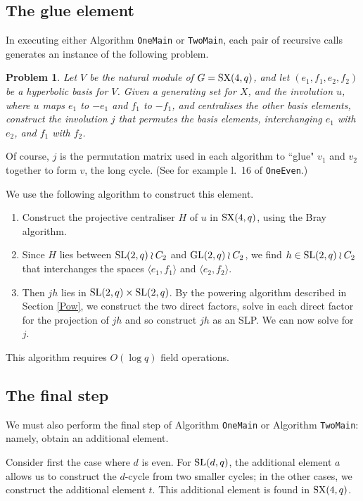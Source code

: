 \documentclass[12pt]{article}
\newtheorem{problem}[definition]{Problem}
\def\SL{{\rm SL}}
\def\GL{{\rm GL}}
\def\SX{{\rm SX}}
\begin{document}
\subsection{The glue element}
In executing either Algorithm {\tt OneMain} or {\tt TwoMain}, 
each pair of recursive calls generates
an instance of the following problem.

\begin{problem}
Let $V$ be the natural module of  $G=\SX(4,q)$, and let
$(e_1,f_1,e_2,f_2)$ be a hyperbolic basis for $V$. Given a generating
set for $X$, and the involution $u$, where $u$ maps $e_1$ to $-e_1$
and $f_1$ to $-f_1$, and centralises the other basis
elements, construct the involution  $j$  that permutes the basis
elements, interchanging $e_1$ with $e_2$, and $f_1$ with $f_2$.
\end{problem}

Of course, $j$ is the permutation matrix used
in each algorithm to ``glue" $v_1$ and $v_2$ together to 
form $v$, the long cycle. 
(See for example l.\ 16 of {\tt OneEven}.)

We use the following algorithm to construct this element. 
\begin{enumerate}
\item 
Construct the projective
centraliser $H$ of $u$ in $\SX(4,q)$, using the Bray algorithm. 

\item 
Since $H$ lies between $\SL(2,q)\wr C_2$ and
$\GL(2,q) \wr C_2$, we find $h\in\SL(2,q)\wr C_2$ that
interchanges the spaces $\langle e_1,f_1\rangle$ and $\langle
e_2,f_2\rangle$. 

\item Then $jh$ lies in $\SL(2,q)\times\SL(2,q)$.  By the
powering algorithm described in Section \ref{Pow}, 
we construct the two direct factors, solve in each
direct factor for the projection of $jh$ and so 
construct $jh$ as an SLP. We can now solve for $j$.
\end{enumerate}
This algorithm requires $O(\log q)$ field operations.

\subsection{The final step}\label{final-step}
We must also perform the final step 
of Algorithm {\tt OneMain} or Algorithm {\tt TwoMain}:
namely, obtain an additional element. 

Consider first the case where $d$ is even. 
For $\SL(d, q)$, the additional element $a$ allows
us to construct the $d$-cycle from two smaller cycles; 
in the other cases, we construct the additional element $t$.
This additional element is found in $\SX(4, q)$.
\end{document}
